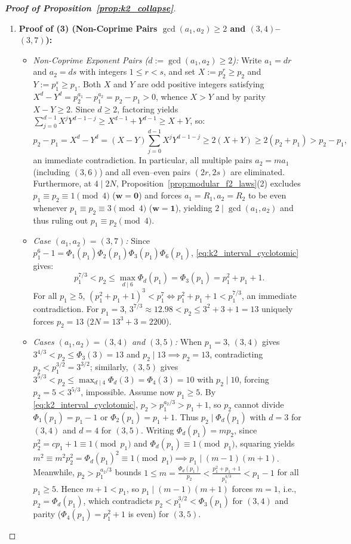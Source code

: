 \documentclass[11pt,a4paper]{article}
\theoremstyle{definition}
\begin{document}
\begin{proof}[\textbf{Proof of Proposition~\ref{prop:k2_collapse}}]
\begin{enumerate}
    \item \textbf{Proof of (3) (Non-Coprime Pairs $\gcd(a_1, a_2) \ge 2$ and $(3, 4)$--$(3, 7)$):}
    \begin{itemize}
        \item \emph{Non-Coprime Exponent Pairs ($d := \gcd(a_1, a_2) \ge 2$):} Write $a_1 = d r$ and $a_2 = d s$ with integers $1 \le r < s$, and set $X := p_2^r \ge p_2$ and $Y := p_1^s \ge p_1$. Both $X$ and $Y$ are odd positive integers satisfying $X^d - Y^d = p_2^{a_1} - p_1^{a_2} = p_2 - p_1 > 0$, whence $X > Y$ and by parity $X - Y \ge 2$. Since $d \ge 2$, factoring yields $\sum_{j=0}^{d-1} X^j Y^{d-1-j} \ge X^{d-1} + Y^{d-1} \ge X + Y$, so:
        \[
        p_2 - p_1 = X^d - Y^d = (X - Y)\sum_{j=0}^{d-1} X^j Y^{d-1-j} \ge 2(X + Y) \ge 2(p_2 + p_1) > p_2 - p_1,
        \]
        an immediate contradiction. In particular, all multiple pairs $a_2 = m a_1$ (including $(3, 6)$) and all even--even pairs $(2r, 2s)$ are eliminated. Furthermore, at $4 \mid 2N$, Proposition~\ref{prop:modular_f2_laws}(2) excludes $p_1 \equiv p_2 \equiv 1 \pmod 4$ ($\mathbf{w} = \mathbf{0}$) and forces $a_1 = R_1, a_2 = R_2$ to be even whenever $p_1 \equiv p_2 \equiv 3 \pmod 4$ ($\mathbf{w} = \mathbf{1}$), yielding $2 \mid \gcd(a_1, a_2)$ and thus ruling out $p_1 \equiv p_2 \pmod 4$.
        \item \emph{Case $(a_1, a_2) = (3, 7)$:} Since $p_1^6 - 1 = \Phi_1(p_1)\Phi_2(p_1)\Phi_3(p_1)\Phi_6(p_1)$, \eqref{eq:k2_interval_cyclotomic} gives:
        \[
        p_1^{7/3} < p_2 \le \max_{d \mid 6} \Phi_d(p_1) = \Phi_3(p_1) = p_1^2 + p_1 + 1.
        \]
        For all $p_1 \ge 5$, $(p_1^2 + p_1 + 1)^3 < p_1^7 \iff p_1^2 + p_1 + 1 < p_1^{7/3}$, an immediate contradiction. For $p_1 = 3$, $3^{7/3} \approx 12.98 < p_2 \le 3^2 + 3 + 1 = 13$ uniquely forces $p_2 = 13$ ($2N = 13^3 + 3 = 2200$).
        \item \emph{Cases $(a_1, a_2) = (3, 4)$ and $(3, 5)$:} When $p_1 = 3$, $(3, 4)$ gives $3^{4/3} < p_2 \le \Phi_3(3) = 13$ and $p_2 \mid 13 \implies p_2 = 13$, contradicting $p_2 < p_1^{3/2} = 3^{3/2}$; similarly, $(3, 5)$ gives $3^{5/3} < p_2 \le \max_{d \mid 4} \Phi_d(3) = \Phi_4(3) = 10$ with $p_2 \mid 10$, forcing $p_2 = 5 < 3^{5/3}$, impossible. Assume now $p_1 \ge 5$. By \eqref{eq:k2_interval_cyclotomic}, $p_2 > p_1^{a_2 / 3} > p_1 + 1$, so $p_2$ cannot divide $\Phi_1(p_1) = p_1 - 1$ or $\Phi_2(p_1) = p_1 + 1$. Thus $p_2 \mid \Phi_d(p_1)$ with $d = 3$ for $(3, 4)$ and $d = 4$ for $(3, 5)$. Writing $\Phi_d(p_1) = m p_2$, since $p_2^2 = c p_1 + 1 \equiv 1 \pmod{p_1}$ and $\Phi_d(p_1) \equiv 1 \pmod{p_1}$, squaring yields $m^2 \equiv m^2 p_2^2 = \Phi_d(p_1)^2 \equiv 1 \pmod{p_1} \implies p_1 \mid (m - 1)(m + 1)$. Meanwhile, $p_2 > p_1^{a_2 / 3}$ bounds $1 \le m = \frac{\Phi_d(p_1)}{p_2} < \frac{p_1^2 + p_1 + 1}{p_1^{4/3}} < p_1 - 1$ for all $p_1 \ge 5$. Hence $m + 1 < p_1$, so $p_1 \mid (m - 1)(m + 1)$ forces $m = 1$, i.e., $p_2 = \Phi_d(p_1)$, which contradicts $p_2 < p_1^{3/2} < \Phi_3(p_1)$ for $(3, 4)$ and parity ($\Phi_4(p_1) = p_1^2 + 1$ is even) for $(3, 5)$.
    \end{itemize}


\end{enumerate}
\end{proof}
\end{document}
